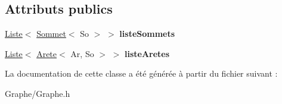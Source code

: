 \subsection*{Attributs publics}
\begin{DoxyCompactItemize}
\item 
\mbox{\label{class_graphe_a5ffc686bbe6009fc1991654678413c21}} 
\mbox{\hyperlink{class_liste}{Liste}}$<$ \mbox{\hyperlink{class_sommet}{Sommet}}$<$ So $>$ $>$ {\bfseries liste\+Sommets}
\item 
\mbox{\label{class_graphe_a15034e8e76b6fdddd7e0cacea009e929}} 
\mbox{\hyperlink{class_liste}{Liste}}$<$ \mbox{\hyperlink{class_arete}{Arete}}$<$ Ar, So $>$ $>$ {\bfseries liste\+Aretes}
\end{DoxyCompactItemize}


La documentation de cette classe a été générée à partir du fichier suivant \+:\begin{DoxyCompactItemize}
\item 
Graphe/Graphe.\+h\end{DoxyCompactItemize}
